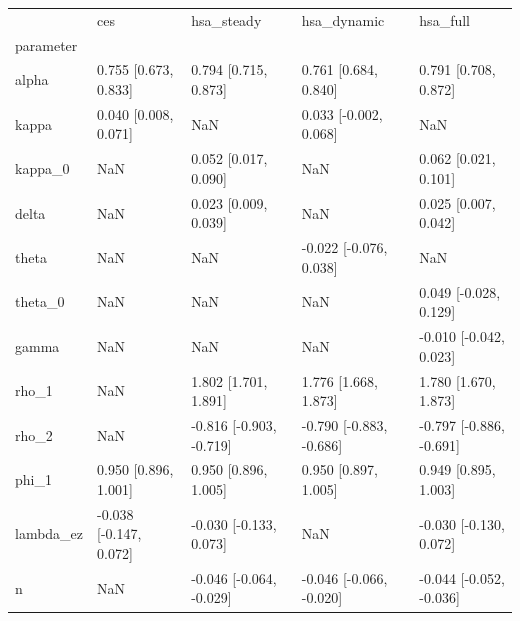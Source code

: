 \begin{tabular}{lllll}
\toprule
 & ces & hsa\_steady & hsa\_dynamic & hsa\_full \\
parameter &  &  &  &  \\
\midrule
alpha & 0.755 [0.673, 0.833] & 0.794 [0.715, 0.873] & 0.761 [0.684, 0.840] & 0.791 [0.708, 0.872] \\
kappa & 0.040 [0.008, 0.071] & NaN & 0.033 [-0.002, 0.068] & NaN \\
kappa\_0 & NaN & 0.052 [0.017, 0.090] & NaN & 0.062 [0.021, 0.101] \\
delta & NaN & 0.023 [0.009, 0.039] & NaN & 0.025 [0.007, 0.042] \\
theta & NaN & NaN & -0.022 [-0.076, 0.038] & NaN \\
theta\_0 & NaN & NaN & NaN & 0.049 [-0.028, 0.129] \\
gamma & NaN & NaN & NaN & -0.010 [-0.042, 0.023] \\
rho\_1 & NaN & 1.802 [1.701, 1.891] & 1.776 [1.668, 1.873] & 1.780 [1.670, 1.873] \\
rho\_2 & NaN & -0.816 [-0.903, -0.719] & -0.790 [-0.883, -0.686] & -0.797 [-0.886, -0.691] \\
phi\_1 & 0.950 [0.896, 1.001] & 0.950 [0.896, 1.005] & 0.950 [0.897, 1.005] & 0.949 [0.895, 1.003] \\
lambda\_ez & -0.038 [-0.147, 0.072] & -0.030 [-0.133, 0.073] & NaN & -0.030 [-0.130, 0.072] \\
n & NaN & -0.046 [-0.064, -0.029] & -0.046 [-0.066, -0.020] & -0.044 [-0.052, -0.036] \\
\bottomrule
\end{tabular}
